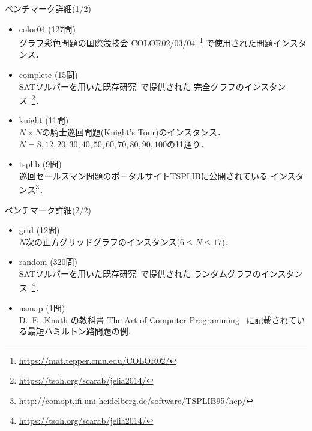 \documentclass[dvipdfmx,10pt]{beamer}
\begin{document}
\begin{frame}[noframenumbering]{ベンチマーク詳細(1/2)}
\begin{itemize}
\item \textsf{color04} (127問)\\
  グラフ彩色問題の国際競技会
  COLOR02/03/04~\footnote{\url{https://mat.tepper.cmu.edu/COLOR02/}}
  で使用された問題インスタンス．
\item \textsf{complete} (15問)\\
  SATソルバーを用いた既存研究~\cite{soh14:jelia2014}で提供された
  完全グラフのインスタンス~\footnote{\url{https://tsoh.org/scarab/jelia2014/}}．
\item \textsf{knight} (11問)\\
  $N\times N$の騎士巡回問題(Knight's Tour)のインスタンス．\\
  $N=8,12,20,30,40,50,60,70,80,90,100$の11通り．
\item \textsf{tsplib} (9問)\\
  巡回セールスマン問題のポータルサイトTSPLIBに公開されている
  インスタンス\footnote{\url{http://comopt.ifi.uni-heidelberg.de/software/TSPLIB95/hcp/}}．
\end{itemize}  
\end{frame}

\begin{frame}[noframenumbering]{ベンチマーク詳細(2/2)}
\begin{itemize}
\item \textsf{grid} (12問)\\
  $N$次の正方グリッドグラフのインスタンス($6\leq N\leq 17$)．
\item \textsf{random} (320問)\\
  SATソルバーを用いた既存研究~\cite{soh14:jelia2014}で提供された
  ランダムグラフのインスタンス~\footnote{\url{https://tsoh.org/scarab/jelia2014/}}．
\item \textsf{usmap} (1問)\\
  D.~E~.Knuth の教科書
  The Art of Computer Programming~\cite{Knuth:TAOCP:SAT}
  に記載されている最短ハミルトン路問題の例.
\end{itemize}
\end{frame}
\end{document}
